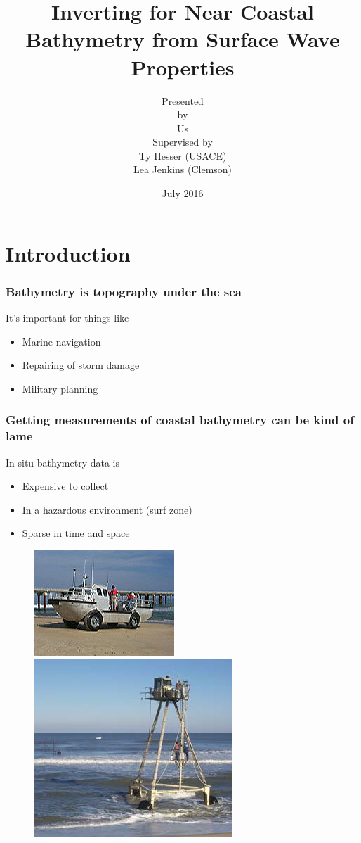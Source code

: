 \documentclass[7pt]{beamer}
\title[Bathymetry Inversion from Waves]{Inverting for Near Coastal Bathymetry from Surface Wave Properties}
\author[USACE Bathymetry]{Presented \\ by\\Us\\Supervised by\\Ty  Hesser (USACE)\\Lea Jenkins (Clemson)}
\institute[IMSM]{Industrial Mathematical and Statistical Modeling}
\date{July 2016}
\begin{document}
 \frame{\titlepage}
\frame{
\frametitle{}
\tableofcontents
}
\section{Introduction }
\begin{frame}
\frametitle{Bathymetry is topography under the sea}
It's important for things like
 \begin{itemize}
\item Marine navigation
\item Repairing of storm damage
\item Military planning
\end{itemize}



\end{frame}
\begin{frame}
 \frametitle{Getting measurements of coastal bathymetry can be kind of lame}
 In situ bathymetry data is
 \begin{itemize}
 \item Expensive to collect
 \item In a hazardous environment (surf zone)
 \item Sparse in time and space
 \end{itemize}

\begin{figure}[h]
\includegraphics[width=.40\linewidth]{img/LARC.jpg}\hfill
\includegraphics[width=.40\linewidth]{img/CRAB2.JPG}
\end{figure}
\end{frame}
\end{document}
